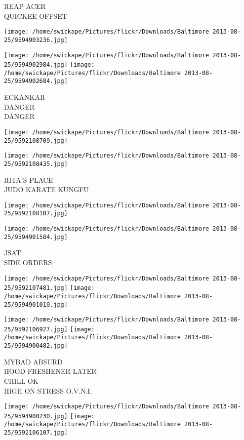 \documentclass[10pt,letterpaper]{article}
\begin{document}
REAP ACER\\
QUICKEE OFFSET
\pagebreak

\texttt{[image: /home/swickape/Pictures/flickr/Downloads/Baltimore 2013-08-25/9594903236.jpg]}

\vspace{0.25in}
\texttt{[image: /home/swickape/Pictures/flickr/Downloads/Baltimore 2013-08-25/9594902984.jpg]}
\texttt{[image: /home/swickape/Pictures/flickr/Downloads/Baltimore 2013-08-25/9594902684.jpg]}

ECKANKAR\\
DANGER\\
DANGER
\pagebreak

\texttt{[image: /home/swickape/Pictures/flickr/Downloads/Baltimore 2013-08-25/9592108709.jpg]}

\vspace{0.25in}
\texttt{[image: /home/swickape/Pictures/flickr/Downloads/Baltimore 2013-08-25/9592108435.jpg]}

RITA'S PLACE\\
JUDO KARATE KUNGFU
\pagebreak

\texttt{[image: /home/swickape/Pictures/flickr/Downloads/Baltimore 2013-08-25/9592108107.jpg]}

\vspace{0.25in}
\texttt{[image: /home/swickape/Pictures/flickr/Downloads/Baltimore 2013-08-25/9594901584.jpg]}

JSAT\\
SIDE ORDERS
\pagebreak

\texttt{[image: /home/swickape/Pictures/flickr/Downloads/Baltimore 2013-08-25/9592107481.jpg]}
\texttt{[image: /home/swickape/Pictures/flickr/Downloads/Baltimore 2013-08-25/9594901010.jpg]}

\texttt{[image: /home/swickape/Pictures/flickr/Downloads/Baltimore 2013-08-25/9592106927.jpg]}
\texttt{[image: /home/swickape/Pictures/flickr/Downloads/Baltimore 2013-08-25/9594900482.jpg]}

MYBAD ABSURD\\
HOOD FRESHENER LATER\\
CHILL OK\\
HIGH ON STRESS O.V.N.I.
\pagebreak

\texttt{[image: /home/swickape/Pictures/flickr/Downloads/Baltimore 2013-08-25/9594900230.jpg]}
\texttt{[image: /home/swickape/Pictures/flickr/Downloads/Baltimore 2013-08-25/9592106107.jpg]}
\end{document}
